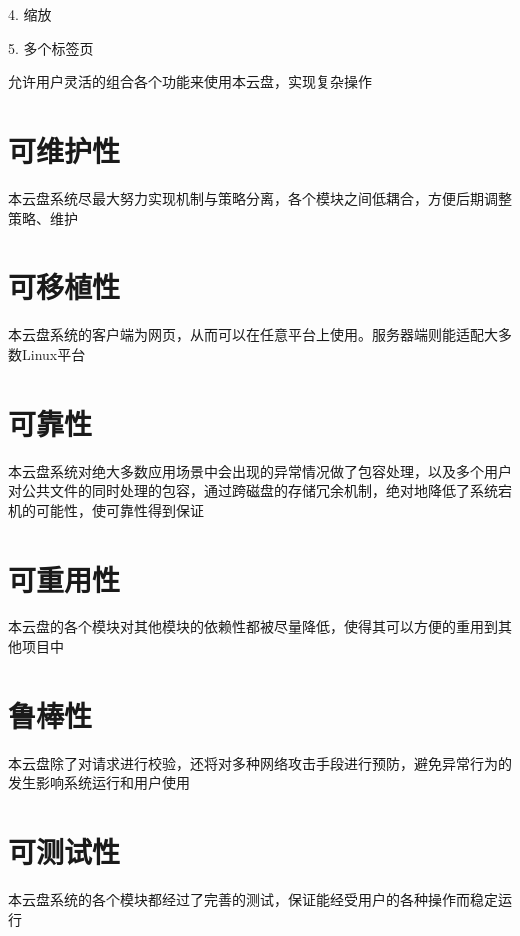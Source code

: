 4. 缩放

5. 多个标签页

允许用户灵活的组合各个功能来使用本云盘，实现复杂操作

\section{可维护性}

本云盘系统尽最大努力实现机制与策略分离，各个模块之间低耦合，方便后期调整策略、维护

\section{可移植性}

本云盘系统的客户端为网页，从而可以在任意平台上使用。服务器端则能适配大多数Linux平台

{
\color{red}
\section{可靠性}

本云盘系统对绝大多数应用场景中会出现的异常情况做了包容处理，以及多个用户对公共文件的同时处理的包容，通过跨磁盘的存储冗余机制，绝对地降低了系统宕机的可能性，使可靠性得到保证
}

\section{可重用性}

本云盘的各个模块对其他模块的依赖性都被尽量降低，使得其可以方便的重用到其他项目中

\section{鲁棒性}

本云盘除了对请求进行校验，还将对多种网络攻击手段进行预防，避免异常行为的发生影响系统运行和用户使用

\section{可测试性}

本云盘系统的各个模块都经过了完善的测试，保证能经受用户的各种操作而稳定运行
